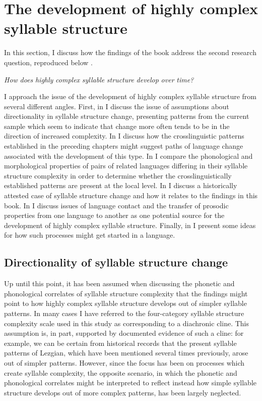 \section{The development of highly complex syllable structure}\label{sec:8.4}

  In this section, I discuss how the findings of the book address the second research question, reproduced below .

\ea\label{ex:(8.2)}
   \textit{How} \textit{does} \textit{highly} \textit{complex} \textit{syllable} \textit{structure} \textit{develop} \textit{over} \textit{time?}
\z

  I approach the issue of the development of highly complex syllable structure from several different angles. First, in  I discuss the issue of assumptions about directionality in syllable structure change, presenting patterns from the current sample which seem to indicate that change more often tends to be in the direction of increased complexity. In  I discuss how the crosslinguistic patterns established in the preceding chapters might suggest paths of language change associated with the development of this type. In  I compare the phonological and morphological properties of pairs of related languages differing in their syllable structure complexity in order to determine whether the crosslinguistically established patterns are present at the local level. In  I discuss a historically attested case of syllable structure change and how it relates to the findings in this book. In  I discuss issues of language contact and the transfer of prosodic properties from one language to another as one potential source for the development of highly complex syllable structure. Finally, in  I present some ideas for how such processes might get started in a language.

\subsection{Directionality of syllable structure change}\label{sec:8.4.1}

  Up until this point, it has been assumed when discussing the phonetic and phonological correlates of syllable structure complexity that the findings might point to how highly complex syllable structure develops out of simpler syllable patterns. In many cases I have referred to the four-category syllable structure complexity scale used in this study as corresponding to a diachronic cline. This assumption is, in part, supported by documented evidence of such a cline: for example, we can be certain from historical records that the present syllable patterns of Lezgian, which have been mentioned several times previously, arose out of simpler patterns. However, since the focus has been on processes which create syllable complexity, the opposite scenario, in which the phonetic and phonological correlates might be interpreted to reflect instead how simple syllable structure develops out of more complex patterns, has been largely neglected.

